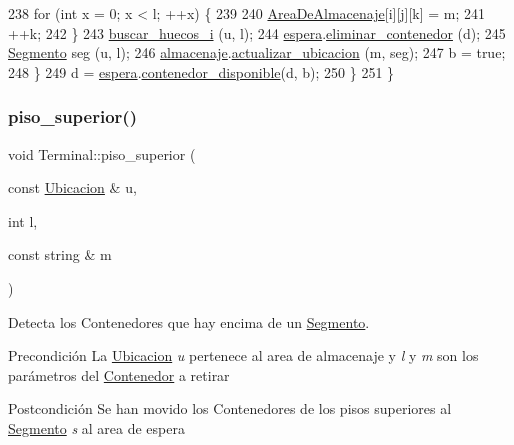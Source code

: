 \begin{DoxyCode}
238             \textcolor{keywordflow}{for} (\textcolor{keywordtype}{int} x = 0; x < l; ++x) \{
239     
240                 \hyperlink{class_terminal_a50670862a5cdeb0504efd1c45b6416dc}{AreaDeAlmacenaje}[i][j][k] = m;
241                 ++k;
242             \}   
243             \hyperlink{class_terminal_a204fc08e3b6f13f75c525f282b023b19}{buscar\_huecos\_i} (u, l);
244             \hyperlink{class_terminal_ac9f71207d73c8d05a9d9d6c046f9f8c3}{espera}.\hyperlink{class_espera_a925d1944461d0e9bedef4d788283b98f}{eliminar\_contenedor} (d);
245             \hyperlink{class_segmento}{Segmento} seg (u, l);
246             \hyperlink{class_terminal_a1d87d7b16c4f460eee6f1ab73da90fd2}{almacenaje}.\hyperlink{class_almacenaje_a4035979df0e66a26d4b98d2b18d3d408}{actualizar\_ubicacion} (m, seg);
247             b = \textcolor{keyword}{true};
248         \}
249         d = \hyperlink{class_terminal_ac9f71207d73c8d05a9d9d6c046f9f8c3}{espera}.\hyperlink{class_espera_ab4205de26cc518d8130d6506796697ea}{contenedor\_disponible}(d, b);     
250     \}
251 \}
\end{DoxyCode}
\mbox{\label{class_terminal_aeadd54221b7138f6b1b4e7d072723ffa}} 
\subsubsection{\texorpdfstring{piso\+\_\+superior()}{piso\_superior()}}
{\footnotesize\ttfamily void Terminal\+::piso\+\_\+superior (\begin{DoxyParamCaption}\item[{const \hyperlink{class_ubicacion}{Ubicacion} \&}]{u,  }\item[{int}]{l,  }\item[{const string \&}]{m }\end{DoxyParamCaption})\hspace{0.3cm}{\ttfamily [private]}}



Detecta los Contenedores que hay encima de un \hyperlink{class_segmento}{Segmento}. 

\begin{DoxyPrecond}{Precondición}
La \hyperlink{class_ubicacion}{Ubicacion} {\itshape u} pertenece al area de almacenaje y {\itshape l} y {\itshape m} son los parámetros del \hyperlink{class_contenedor}{Contenedor} a retirar 
\end{DoxyPrecond}
\begin{DoxyPostcond}{Postcondición}
Se han movido los Contenedores de los pisos superiores al \hyperlink{class_segmento}{Segmento} {\itshape s} al area de espera 
\end{DoxyPostcond}


